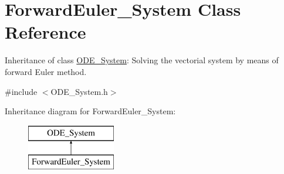 \hypertarget{class_forward_euler___system}{}\section{Forward\+Euler\+\_\+\+System Class Reference}
\label{class_forward_euler___system}


Inheritance of class \mbox{\hyperlink{class_o_d_e___system}{O\+D\+E\+\_\+\+System}}\+: Solving the vectorial system by means of forward Euler method.  




{\ttfamily \#include $<$O\+D\+E\+\_\+\+System.\+h$>$}

Inheritance diagram for Forward\+Euler\+\_\+\+System\+:\begin{figure}[H]
\begin{center}
\leavevmode
\includegraphics[height=2.000000cm]{class_forward_euler___system}
\end{center}
\end{figure}
